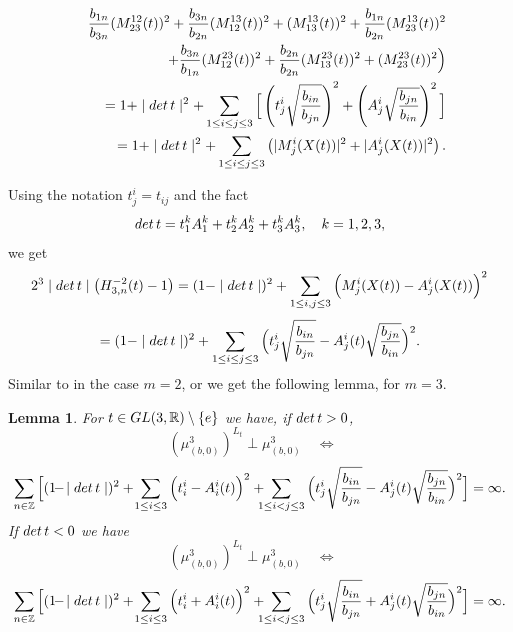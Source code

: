 \documentclass[preprint,12pt]{elsarticle}
\newtheorem{lem}[thm]{Lemma}
\numberwithin{equation}{section}
\begin{document}
\begin{eqnarray*}
&&
\frac{b_{1n}}{b_{3n}}(M^{12}_{23}(t))^2+\frac{b_{3n}}{b_{2n}}(M^{13}_{12}(t))^2+(M^{13}_{13}(t))^2+\frac{b_{1n}}{b_{2n}}(M^{13}_{23}(t))^2\\
&&
+\frac{b_{3n}}{b_{1n}}(M^{23}_{12}(t))^2+\frac{b_{2n}}{b_{2n}}(M^{23}_{13}(t))^2+(M^{23}_{23}(t))^2
\Big)\\
%
&&=
1+\mid{\rm det}\,t\mid^2+ \sum_{1\leq i\leq j\leq 3}\Big[\left(t^i_j\sqrt{\frac{b_{in}}{b_{jn}}}\right)^2 +
\left(A^i_j\sqrt{\frac{b_{jn}}{b_{in}}}\right)^2\Big]\\
%
&&=1+\mid{\rm det}\,t\mid^2+
\sum_{1\leq i\leq j\leq 3}\left(\vert M^i_j(X(t))\vert^2+\vert A^i_j(X(t))\vert^2\right).
\end{eqnarray*}

Using the notation $t^i_j=t_{ij}$ and the fact
$$
{\rm det}\,t=t^k_1A^k_1+t^k_2A^k_2+t^k_3A^k_3,\quad k=1,2,3,
$$
we get
$$
2^3\mid{\rm det}\,t\mid\big(H_{3,n}^{-2}(t)-1\big)=
(1-\mid{\rm det}\,t\mid)^2+
\sum_{1\leq i,j\leq 3}\Big(M^i_j(X(t))-A^i_j(X(t))\Big)^2
$$
\begin{equation}
 \label{(x-y)^2=.3}
=(1-\mid{\rm det}\,t\mid)^2+ \sum_{1\leq i\leq j\leq 3}\Big(t^i_j\sqrt{\frac{b_{in}}{b_{jn}}} -A^i_j(t)\sqrt{\frac{b_{jn}}{b_{in}}}\Big)^2.
\end{equation}
%
Similar to \cite[Lemmas~2.22]{KosJFA17} in the case $m=2$, or \cite[Lemma~10.4.30]{Kos_B_09} we get the following lemma, for $m=3$.
%
\begin{lem}
\label{l.mu^3(b,0)^t-perp}
 For $t\in {\rm GL}(3,{\mathbb R})\setminus\{e\}$ we have, if ${\rm det}\,t>0$,
$$
(\mu_{(b,0)}^3)^{L_t}\perp\mu_{(b,0)}^3\quad\Leftrightarrow\quad
$$
\begin{equation}
\label{mu^3(b,0)^t-perp.>0} 
\sum_{n\in{\mathbb Z}}\Big[ 
(1\!-\!\mid{\rm det}\,t\mid)^2+\! \sum_{1\leq i\leq 3}\Big(t^i_i -A^i_i(t)\Big)^2
+\!\!\!\!\sum_{1\leq i<j\leq 3}\Big(t^i_j\sqrt{\frac{b_{in}}{b_{jn}}} -A^i_j(t)\sqrt{\frac{b_{jn}}{b_{in}}}\Big)^2
\Big]=\infty.
\end{equation}
If ${\rm det}\,t<0$ we have
$$
(\mu_{(b,0)}^3)^{L_t}\perp\mu_{(b,0)}^3\quad\Leftrightarrow\quad
$$
\begin{equation}
\label{mu^3(b,0)^t-perp.<0}
\sum_{n\in{\mathbb Z}} \Big[ 
(1\!-\!\mid{\rm det}\,t\mid)^2+\! \sum_{1\leq i\leq 3}\Big(t^i_i +A^i_i(t)\Big)^2+
\!\!\!\!\sum_{1\leq i<j\leq 3}\Big(t^i_j\sqrt{\frac{b_{in}}{b_{jn}}} +A^i_j(t)\sqrt{\frac{b_{jn}}{b_{in}}}\Big)^2
\Big]=\infty.
\end{equation}
\end{lem}
\end{document}
